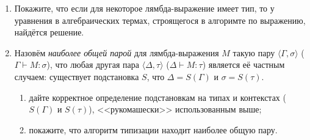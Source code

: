 \documentclass[10pt,a4paper,oneside]{article}
\begin{document}
\begin{enumerate}
\item Покажите, что если для некоторое лямбда-выражение имеет тип, то у уравнения в алгебраических
термах, строящегося в алгоримте по выражению, найдётся решение.

\item Назовём \emph{наиболее общей парой} для лямбда-выражения $M$ такую пару $\langle \Gamma, \sigma \rangle$ ($\Gamma\vdash M:\sigma$), 
что любая другая пара $\langle\Delta,\tau\rangle$ ($\Delta\vdash M:\tau$) является её частным случаем:
существует подстановка $S$, что $\Delta = S(\Gamma)$ и $\sigma = S(\tau)$. 
\begin{enumerate}
\item дайте корректное определение подстановкам на типах и контекстах ($S(\Gamma)$ и $S(\tau)$), 
<<рукомашески>> использованным выше;
\item покажите, что алгоритм типизации находит наиболее общую пару.
\end{enumerate}

\end{enumerate}
\end{document}
